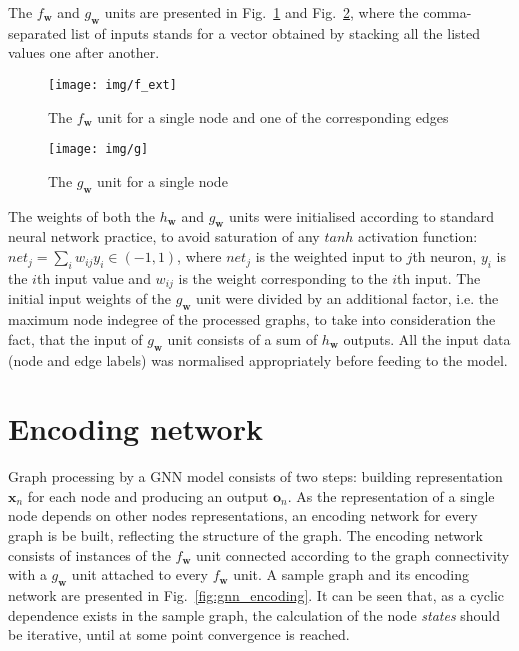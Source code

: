 The $f_{\bm{w}}$ and $g_{\bm{w}}$ units are presented in Fig.~\ref{fig:gnn_f} and Fig.~\ref{fig:gnn_g}, where the comma-separated list of inputs stands for a vector obtained by stacking all the listed values one after another.

\begin{figure}[h!]
\begin{center}
	\texttt{[image: img/f\_ext]}
	\caption{The $f_{\bm{w}}$ unit for a single node and one of the corresponding edges}
	\label{fig:gnn_f}
\end{center}
\end{figure}

\begin{figure}[h!]
\begin{center}
	\texttt{[image: img/g]}
	\caption{The $g_{\bm{w}}$ unit for a single node}
	\label{fig:gnn_g}
\end{center}
\end{figure}

The weights of both the $h_{\bm{w}}$ and $g_{\bm{w}}$ units were initialised according to standard neural network practice, to avoid saturation of any $tanh$ activation function: $net_j = \sum_i w_{ij} y_i \in (-1, 1)$, where $net_j$ is the weighted input to $j$th neuron, $y_i$ is the $i$th input value and $w_{ij}$ is the weight corresponding to the $i$th input. The initial input weights of the $g_{\bm{w}}$ unit were divided by an additional factor, i.e. the maximum node indegree of the processed graphs, to take into consideration the fact, that the input of $g_{\bm{w}}$ unit consists of a sum of $h_{\bm{w}}$ outputs. All the input data (node and edge labels) was normalised appropriately before feeding to the model.


\section{Encoding network}
Graph processing by a GNN model consists of two steps: building representation $\bm{x}_n$ for each node and producing an output $\bm{o}_n$. As the representation of a single node depends on other nodes representations, an encoding network for every graph is be built, reflecting the structure of the graph. The encoding network consists of instances of the $f_{\bm{w}}$ unit connected according to the graph connectivity with a $g_{\bm{w}}$ unit attached to every $f_{\bm{w}}$ unit. A sample graph and its encoding network are presented in Fig.~\ref{fig:gnn_encoding}.
It can be seen that, as a cyclic dependence exists in the sample graph, the calculation of the node \emph{states} should be iterative, until at some point convergence is reached.

